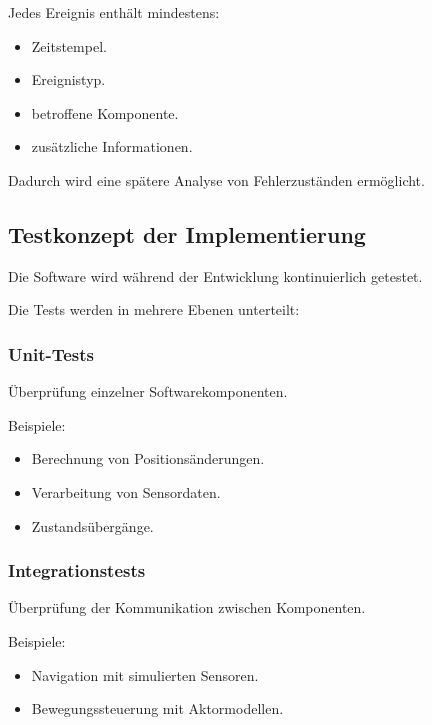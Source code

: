Jedes Ereignis enthält mindestens:

\begin{itemize}
\tightlist
\item
  Zeitstempel.
\item
  Ereignistyp.
\item
  betroffene Komponente.
\item
  zusätzliche Informationen.
\end{itemize}

Dadurch wird eine spätere Analyse von Fehlerzuständen ermöglicht.

\subsection{Testkonzept der
Implementierung}\label{testkonzept-der-implementierung}

Die Software wird während der Entwicklung kontinuierlich getestet.

Die Tests werden in mehrere Ebenen unterteilt:

\subsubsection{Unit-Tests}\label{unit-tests}

Überprüfung einzelner Softwarekomponenten.

Beispiele:

\begin{itemize}
\tightlist
\item
  Berechnung von Positionsänderungen.
\item
  Verarbeitung von Sensordaten.
\item
  Zustandsübergänge.
\end{itemize}

\subsubsection{Integrationstests}\label{integrationstests}

Überprüfung der Kommunikation zwischen Komponenten.

Beispiele:

\begin{itemize}
\tightlist
\item
  Navigation mit simulierten Sensoren.
\item
  Bewegungssteuerung mit Aktormodellen.
\end{itemize}

